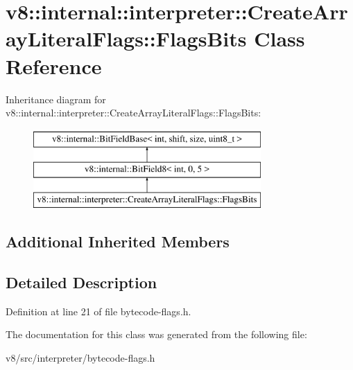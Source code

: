 \hypertarget{classv8_1_1internal_1_1interpreter_1_1CreateArrayLiteralFlags_1_1FlagsBits}{}\section{v8\+:\+:internal\+:\+:interpreter\+:\+:Create\+Array\+Literal\+Flags\+:\+:Flags\+Bits Class Reference}
\label{classv8_1_1internal_1_1interpreter_1_1CreateArrayLiteralFlags_1_1FlagsBits}
Inheritance diagram for v8\+:\+:internal\+:\+:interpreter\+:\+:Create\+Array\+Literal\+Flags\+:\+:Flags\+Bits\+:\begin{figure}[H]
\begin{center}
\leavevmode
\includegraphics[height=3.000000cm]{classv8_1_1internal_1_1interpreter_1_1CreateArrayLiteralFlags_1_1FlagsBits}
\end{center}
\end{figure}
\subsection*{Additional Inherited Members}


\subsection{Detailed Description}


Definition at line 21 of file bytecode-\/flags.\+h.



The documentation for this class was generated from the following file\+:\begin{DoxyCompactItemize}
\item 
v8/src/interpreter/bytecode-\/flags.\+h\end{DoxyCompactItemize}
